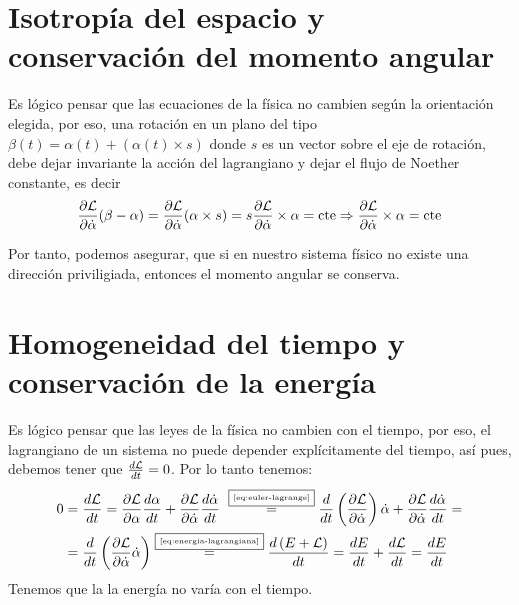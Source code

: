 \section{Isotropía del espacio y conservación del momento angular}\label{sec:isotropia-del-espacio-y-conservacion-del-momento-angular}
Es lógico pensar que las ecuaciones de la física no cambien según la orientación elegida, por eso, una rotación en un plano del tipo $\beta(t)=\alpha(t) + (\alpha(t)\times s)$ donde $s$ es un vector sobre el eje de rotación, debe dejar invariante la acción del lagrangiano y dejar el flujo de Noether constante, es decir
\begin{equation}
	\label{eq:conservacion_momento_angular}
	\frac{\partial \mathcal{L}}{\partial\dot{\alpha}}(\beta-\alpha) = \frac{\partial \mathcal{L}}{\partial\dot{\alpha}}(\alpha\times s) = s \frac{\partial \mathcal{L}}{\partial\dot{\alpha}}\times \alpha=\text{cte}\Rightarrow\frac{\partial \mathcal{L}}{\partial\dot{\alpha}}\times \alpha=\text{cte}
\end{equation}

Por tanto, podemos asegurar, que si en nuestro sistema físico no existe una dirección priviligiada, entonces el momento angular se conserva.

\section{Homogeneidad del tiempo y conservación de la energía}\label{sec:homogeneidad-del-tiempo-y-conservacion-de-la-energia}

Es lógico pensar que las leyes de la física no cambien con el tiempo, por eso, el lagrangiano de un sistema no puede depender explícitamente del tiempo, así pues, debemos tener que $\frac{d\mathcal{L}}{dt}=0$.
Por lo tanto tenemos:
\begin{align*}
	0 & = \frac{d\mathcal{L}}{dt}=\frac{\partial \mathcal{L}}{\partial \alpha}\frac{d\alpha}{dt}+\frac{\partial \mathcal{L}}{\partial \dot{\alpha}}\frac{d\dot{\alpha}}{dt} ~\overset{\fbox{\tiny \ref{eq:euler-lagrange}}}{=} \frac{d}{dt}\left(\frac{\partial \mathcal{L}}{\partial \dot{\alpha}}\right)\dot{\alpha}+\frac{\partial \mathcal{L}}{\partial \dot{\alpha}}\frac{d\dot{\alpha}}{dt}=\\
	& = \frac{d}{dt}\left(\frac{\partial \mathcal{L}}{\partial \dot{\alpha}}\dot{\alpha}\right)\overset{\fbox{\tiny \ref{eq:energia-lagrangiana}}}{=}\frac{d\left(E+\mathcal{L}\right)}{dt}=\frac{d E}{dt}+\frac{d\mathcal{L}}{dt}=\frac{d E}{dt}
\end{align*}
Tenemos que la la energía no varía con el tiempo.
